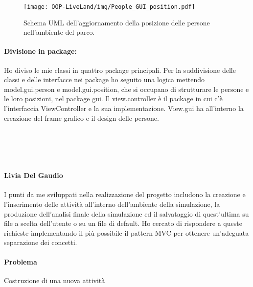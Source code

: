\documentclass[a4paper,12pt]{report}
\begin{document}
\begin{figure}[h]
\centering{}
\texttt{[image: OOP-LiveLand/img/People\_GUI\_position.pdf]}
\caption{Schema UML dell'aggiornamento della posizione delle persone nell'ambiente del parco.}
\label{img:People_GUI_position}
\end{figure}

\paragraph{Divisione in package:} Ho diviso le mie classi in quattro package principali. Per la suddivisione delle classi e delle interfacce nei package ho seguito una logica mettendo model.gui.person e model.gui.position, che si occupano di strutturare le persone e le loro posizioni, nel package gui. Il view.controller è il package in cui c’è l’interfaccia ViewController e la sua implementazione. View.gui ha all’interno la creazione del frame grafico e il design delle persone.\\\\\\\\\\


\paragraph{Livia Del Gaudio}
\paragraph{} I punti da me sviluppati nella realizzazione del progetto includono la creazione e l’inserimento delle attività all’interno dell’ambiente della simulazione, la produzione dell’analisi finale della simulazione ed il salvataggio di quest’ultima su file a scelta dell’utente o su un file di default. Ho cercato di rispondere a queste richieste implementando il più possibile il pattern MVC per ottenere un’adeguata separazione dei concetti.

\paragraph{Problema} Costruzione di una nuova attività
\end{document}
